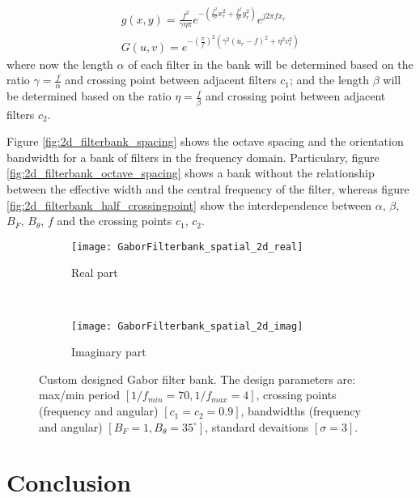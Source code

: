 \begin{equation}\label{eq:gabor_function_2d_spacefreq_bank}
    \begin{gathered}
         g(x,y) =  \frac{f^2}{\gamma \eta \pi} e ^{-\left(\frac{f^2}{\gamma^2} x_r^2 + \frac{f^2}{\eta^2} y_r^2\right)} e ^{j 2 \pi f x_r } \\
         G(u,v) =  e ^{-\left(\frac{\pi}{f}\right)^2\left( \gamma^2 (u_r-f)^2 + \eta^2 v_r^2\right)}
     \end{gathered}
\end{equation}
where now the length $\alpha$ of each filter in the bank will be determined based on the ratio $\gamma = \frac{f}{\alpha}$ and crossing point between adjacent filters $c_1$; and the length $\beta$ will be determined based on the ratio $\eta = \frac{f}{\beta}$ and crossing point between adjacent filters $c_2$.

Figure \ref{fig:2d_filterbank_spacing} shows the octave spacing and the orientation bandwidth for a bank of filters in the frequency domain. Particulary, figure \ref{fig:2d_filterbank_octave_spacing} shows a bank without the relationship between the effective width and the central frequency of the filter, whereas figure \ref{fig:2d_filterbank_half_crossingpoint} show the interdependence between $\alpha$, $\beta$, $B_F$, $B_{\theta}$, $f$ and the crossing points $c_1$, $c_2$.

\begin{figure}[!ht]
	\centering
	\begin{subfigure}[b]{0.8\textwidth}
		\texttt{[image: GaborFilterbank\_spatial\_2d\_real]}
		\caption{Real part}
		\label{fig:2d_filterbank_real}
	\end{subfigure}\\
	\begin{subfigure}[b]{0.8\textwidth}
		\centering
		\texttt{[image: GaborFilterbank\_spatial\_2d\_imag]}
		\caption{Imaginary part}
		\label{fig:2d_filterbank_imag}
	\end{subfigure}
	    
    \caption{Custom designed Gabor filter bank. The design parameters are: max/min period $[1/f_{min}=70, 1/f_{max}=4]$, crossing points (frequency and angular) $[c_1=c_2= 0.9]$, bandwidths (frequency and angular) $[B_F=1, B_{\theta} = 35^{\circ}]$, standard devaitions $[\sigma=3]$.}\label{fig:2d_filterbank}
\end{figure}

\section{Conclusion}

